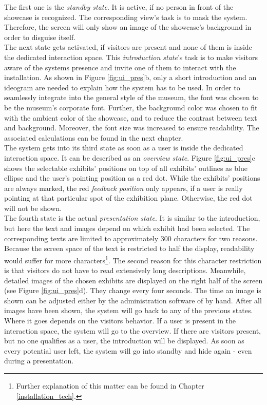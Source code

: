 The first one is the \textit{standby state}. It is active, if no person in front of the showcase is recognized. The corresponding view's task is to mask the system. Therefore, the screen will only show an image of the showcase's background in order to disguise itself. 
\\
The next state gets activated, if visitors are present and none of them is inside the dedicated interaction space. This \textit{introduction state}'s task is to make visitors aware of the systems presence and invite one of them to interact with the installation. As shown in Figure \ref{fig:ui_pres}b, only a short introduction and an ideogram are needed to explain how the system has to be used. In order to seamlessly integrate into the general style of the museum, the font was chosen to be the museum's corporate font. Further, the background color was chosen to fit with the ambient color of the showcase, and to reduce the contrast between text and background. Moreover, the font size was increased to ensure readability. The associated calculations can be found in the next chapter. 
\\
The system gets into its third state as soon as a user is inside the dedicated interaction space. It can be described as an \textit{overview state}. Figure \ref{fig:ui_pres}c shows the selectable exhibits' positions on top of all exhibits' outlines as blue ellipse and the user's pointing position as a red dot. While the exhibits' positions are always marked, the red \textit{feedback position} only appears, if a user is really pointing at that particular spot of the exhibition plane. Otherwise, the red dot will not be shown.
\\
The fourth state is the actual \textit{presentation state}. It is similar to the introduction, but here the text and images depend on which exhibit had been selected. The corresponding texts are limited to approximately 300 characters for two reasons. Because the screen space of the text is restricted to half the display, readability would suffer for more characters\footnote{Further explanation of this matter can be found in Chapter \ref{installation_tech}.}. The second reason for this character restriction is that visitors do not have to read extensively long descriptions. Meanwhile, detailed images of the chosen exhibits are displayed on the right half of the screen (see Figure \ref{fig:ui_pres}d). They change every four seconds. The time an image is shown can be adjusted either by the administration software of by hand. After all images have been shown, the system will go back to any of the previous states. Where it goes depends on the visitors behavior. If a user is present in the interaction space, the system will go to the overview. If there are visitors present, but no one qualifies as a user, the introduction will be displayed. As soon as every potential user left, the system will go into standby and hide again - even during a presentation.


